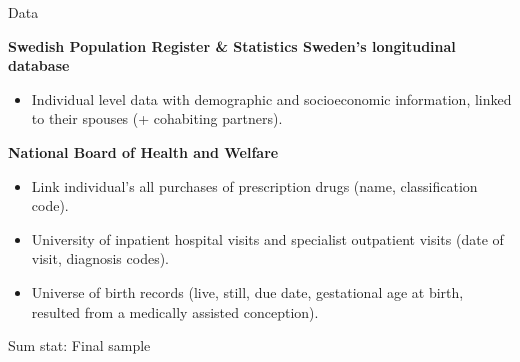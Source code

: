 \documentclass[notes,11pt, aspectratio=169]{beamer}
\newenvironment{wideitemize}{\itemize\addtolength{\itemsep}{0.4em}}{\enditemize}
\begin{document}
\begin{frame}{Data}
\begin{wideitemize}
\item \textbf{Swedish Population Register \& Statistics Sweden's longitudinal database}
	\begin{itemize}
		\item Individual level data with demographic and socioeconomic information, linked to their spouses (+ cohabiting partners).	
	\end{itemize}
\item \textbf{National Board of Health and Welfare}
	\begin{itemize}
		\item Link individual's all purchases of prescription drugs (name, classification code).
		\item University of inpatient hospital visits and specialist outpatient visits (date of visit, diagnosis codes).
		\item Universe of birth records (live, still, due date, gestational age at birth, resulted from a medically assisted conception).
	\end{itemize}
\end{wideitemize}	
\end{frame}

\begin{frame}{Sum stat: Final sample}
	\begin{figure}
	\end{figure}
\end{frame}
\end{document}
